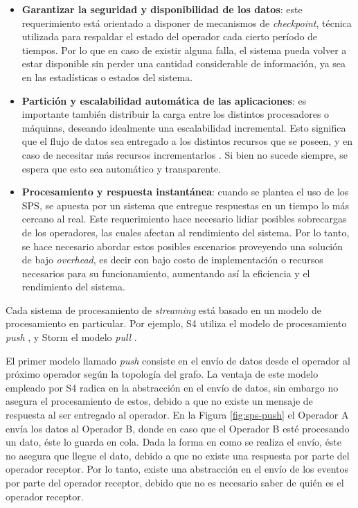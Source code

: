 \begin{itemize}
	\item \textbf{Garantizar la seguridad y disponibilidad de los datos}: este requerimiento está orientado \normalsize{a disponer de} mecanismos de \textit{checkpoint}, técnica utilizada para respaldar el estado del operador cada cierto período de tiempos. Por lo que en caso de existir alguna falla, el sistema pueda volver a estar disponible sin perder una cantidad considerable de información, ya sea en las estadísticas o estados del sistema.
	\item \textbf{Partición y escalabilidad automática de las aplicaciones}: es importante también distribuir la carga entre los distintos procesadores o máquinas, deseando idealmente una escalabilidad incremental. Esto significa que el flujo de datos sea entregado a los distintos recursos que se poseen, y en caso de necesitar más recursos incrementarlos \citep{bookTanenbaum}. Si bien no sucede siempre, se espera que esto sea automático y transparente.
	\item \textbf{Procesamiento y respuesta instantánea}: cuando se plantea el uso de los SPS, se apuesta por un sistema que entregue respuestas en un tiempo lo más cercano al real. Este requerimiento hace necesario lidiar posibles sobrecargas de los operadores, las cuales afectan al rendimiento del sistema. Por lo tanto, se hace necesario abordar estos posibles escenarios proveyendo una solución de bajo \textit{overhead}, \normalsize{es decir} con bajo costo de implementación o recursos necesarios para su funcionamiento, aumentando así la eficiencia y el rendimiento del sistema.
\end{itemize}

Cada sistema de procesamiento de \textsl{streaming} está basado en un modelo de procesamiento en particular. Por ejemplo, S4 utiliza el modelo de procesamiento \textsl{push} \citep{s4yahoo}, y Storm el modelo \textsl{pull} \citep{stormtwitter}.

El primer modelo llamado \textit{push} consiste en el envío de datos desde el operador \normalsize{al próximo operador según la topología del grafo}. La ventaja de este modelo empleado por S4 radica en la abstracción en el envío de datos, sin embargo no asegura el procesamiento de estos, debido a que no existe un mensaje de respuesta al ser entregado al operador. En la Figura \ref{fig:sps-push} el Operador A envía los datos al Operador B, donde en caso que el Operador B esté procesando un dato, éste lo guarda en cola. \normalsize{Dada la forma en como se realiza el envío, éste no asegura que llegue el dato, debido a que no existe una respuesta por parte del operador receptor. Por lo tanto, existe una abstracción en el envío de los eventos por parte del operador receptor, debido que no es necesario saber de quién es el operador receptor.}

